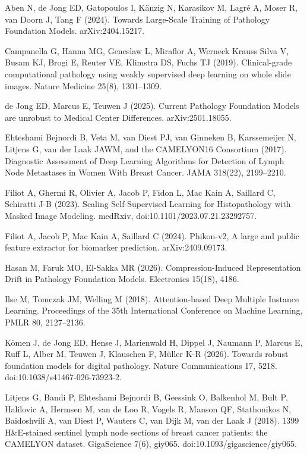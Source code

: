 \documentclass[11pt,a4paper]{article}
\begin{document}
\begin{list}{}{\setlength{\leftmargin}{1.5em}\setlength{\itemindent}{-1.5em}\setlength{\itemsep}{0.25em}\setlength{\parsep}{0pt}}\small\raggedright
\item Aben N, de Jong ED, Gatopoulos I, K\"anzig N, Karasikov M, Lagr\'e A, Moser R, van Doorn J, Tang F (2024). Towards Large-Scale Training of Pathology Foundation Models. arXiv:2404.15217.
\item Campanella G, Hanna MG, Geneslaw L, Miraflor A, Werneck Krauss Silva V, Busam KJ, Brogi E, Reuter VE, Klimstra DS, Fuchs TJ (2019). Clinical-grade computational pathology using weakly supervised deep learning on whole slide images. Nature Medicine 25(8), 1301--1309.
\item de Jong ED, Marcus E, Teuwen J (2025). Current Pathology Foundation Models are unrobust to Medical Center Differences. arXiv:2501.18055.
\item Ehteshami Bejnordi B, Veta M, van Diest PJ, van Ginneken B, Karssemeijer N, Litjens G, van der Laak JAWM, and the CAMELYON16 Consortium (2017). Diagnostic Assessment of Deep Learning Algorithms for Detection of Lymph Node Metastases in Women With Breast Cancer. JAMA 318(22), 2199--2210.
\item Filiot A, Ghermi R, Olivier A, Jacob P, Fidon L, Mac Kain A, Saillard C, Schiratti J-B (2023). Scaling Self-Supervised Learning for Histopathology with Masked Image Modeling. medRxiv, doi:10.1101/2023.07.21.23292757.
\item Filiot A, Jacob P, Mac Kain A, Saillard C (2024). Phikon-v2, A large and public feature extractor for biomarker prediction. arXiv:2409.09173.
\item Hasan M, Faruk MO, El-Sakka MR (2026). Compression-Induced Representation Drift in Pathology Foundation Models. Electronics 15(18), 4186.
\item Ilse M, Tomczak JM, Welling M (2018). Attention-based Deep Multiple Instance Learning. Proceedings of the 35th International Conference on Machine Learning, PMLR 80, 2127--2136.
\item K\"omen J, de Jong ED, Hense J, Marienwald H, Dippel J, Naumann P, Marcus E, Ruff L, Alber M, Teuwen J, Klauschen F, M\"uller K-R (2026). Towards robust foundation models for digital pathology. Nature Communications 17, 5218. doi:10.1038/s41467-026-73923-2.
\item Litjens G, Bandi P, Ehteshami Bejnordi B, Geessink O, Balkenhol M, Bult P, Halilovic A, Hermsen M, van de Loo R, Vogels R, Manson QF, Stathonikos N, Baidoshvili A, van Diest P, Wauters C, van Dijk M, van der Laak J (2018). 1399 H\&E-stained sentinel lymph node sections of breast cancer patients: the CAMELYON dataset. GigaScience 7(6), giy065. doi:10.1093/gigascience/giy065.

\end{list}
\end{document}
